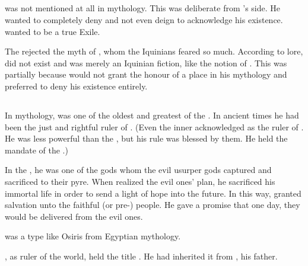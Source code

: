 \subsection{\Ishnaruchaefir}
\Ishnaruchaefir was not mentioned at all in \Ortaican mythology.
This was deliberate from \Secherdamon's side. 
He wanted to completely deny \Ishnaruchaefir and not even deign to acknowledge his existence.
\Secherdamon wanted \Ishnaruchaefir to be a true Exile. 

The \Ortaicans rejected the myth of , whom the Iquinians feared so much.
According to \rethyactic lore, \Isphet did not exist and was merely an Iquinian fiction, like the notion of . 
This was partially because \Secherdamon would not grant \Ishnaruchaefir the honour of a place in his mythology and preferred to deny his existence entirely. 









\subsection{\Mezzagrael}
In \Ortaican mythology, \Mezzagrael was one of the oldest and greatest of the \taorthae. 
In ancient times he had been the just and rightful ruler of \Miith. 
(Even the inner \arcana acknowledged \Mezzagrael as the ruler of \Miith.
 He was less powerful than the \Primordials, but his rule was blessed by them.
 He held the mandate of the \Primordials.)

In the , he was one of the gods whom the evil usurper gods captured and sacrificed to their pyre. 
When \Mezzagrael realized the evil ones' plan, he sacrificed his immortal life in order to send a light of hope into the future. 
In this way, \Mezzagrael granted salvation unto the faithful (\Ortaican or pre-\Ortaican) people.
He gave a promise that one day, they would be delivered from the evil ones. 

\Mezzagrael was a type like Osiris from Egyptian mythology. 

\Mezzagrael, as ruler of the world, held the title \Nechsain. 
He had inherited it from \Settras, his father. 





